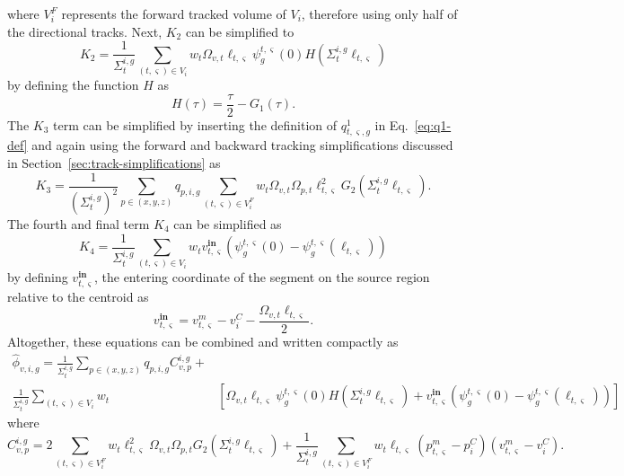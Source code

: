 where $V^F_i$ represents the forward tracked volume of $V_i$, therefore using only half of the directional tracks. Next, $K_2$ can be simplified to
\begin{equation}
K_2 = \frac{1}{\Sigma_{t}^{i,g}} \sum_{(t,\varsigma) \in V_i} w_t \Omega_{v,t} \ell_{t,\varsigma} \psi^{t,\varsigma}_g(0) H(\Sigma_{t}^{i,g} \ell_{t,\varsigma})
\end{equation}
by defining the function $H$ as
\begin{equation}
H(\tau) = \frac{\tau}{2} - G_1(\tau).
\end{equation}
The $K_3$ term can be simplified by inserting the definition of $q^1_{t,\varsigma,g}$ in Eq.~\ref{eq:q1-def} and again using the forward and backward tracking simplifications discussed in Section~\ref{sec:track-simplifications} as
\begin{equation}
K_3 = \frac{1}{\left(\Sigma_{t}^{i,g}\right)^2} \sum_{p \in (x,y,z)} q_{p,i,g} \sum_{(t,\varsigma) \in V^F_i} w_t \Omega_{v,t} \Omega_{p,t} \ell_{t,\varsigma}^2 G_2(\Sigma_{t}^{i,g} \ell_{t,\varsigma}).
\end{equation}
The fourth and final term $K_4$ can be simplified as
\begin{equation}
K_4 = \frac{1}{\Sigma_{t}^{i,g}} \sum_{(t,\varsigma) \in V_i} w_t v^{\textbf{in}}_{t,\varsigma} \left(\psi^{t,\varsigma}_g(0) - \psi^{t,\varsigma}_g(\ell_{t,\varsigma}) \right)
\end{equation}
by defining $v^{\textbf{in}}_{t,\varsigma}$, the entering coordinate of the segment on the source region relative to the centroid as
\begin{equation}
v^{\textbf{in}}_{t,\varsigma} = v^m_{t,\varsigma} - v^C_i - \frac{\Omega_{v,t} \ell_{t,\varsigma}}{2}.
\end{equation}
Altogether, these equations can be combined and written compactly as
\begin{equation}
\begin{split}
\hat{\phi}_{v,i,g} = \frac{1}{\Sigma_{t}^{i,g}} \sum_{p \in (x,y,z)} q_{p,i,g} C_{v,p}^{i,g} + & \\
\frac{1}{\Sigma_{t}^{i,g}} \sum_{(t,\varsigma) \in V_i} w_t & \left[\Omega_{v,t} \ell_{t,\varsigma} \psi^{t,\varsigma}_g(0) H(\Sigma_{t}^{i,g} \ell_{t,\varsigma}) + v^{\textbf{in}}_{t,\varsigma} \left(\psi^{t,\varsigma}_g(0) - \psi^{t,\varsigma}_g(\ell_{t,\varsigma}) \right)\right]
\end{split}
\label{eq:final-scalar-flux-moments}
\end{equation}
where
\begin{equation}
C_{v,p}^{i,g} =  2 \sum_{(t,\varsigma) \in V^F_i} w_t \ell_{t,\varsigma}^2 \Omega_{v,t} \Omega_{p,t} G_2(\Sigma_{t}^{i,g} \ell_{t,\varsigma}) + \frac{1}{\Sigma_{t}^{i,g}} \sum_{(t,\varsigma) \in V^F_i} w_t \ell_{t,\varsigma} \left( p^m_{t,\varsigma} - p^C_i \right) \left(v^m_{t,\varsigma} - v^C_i\right).
\label{eq:ls-C}
\end{equation}

